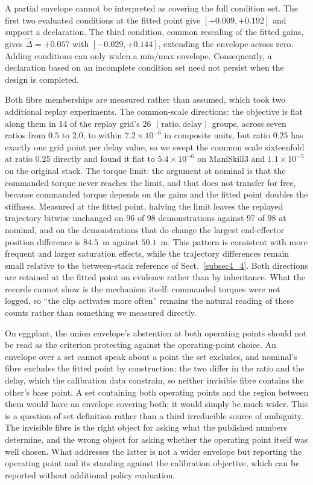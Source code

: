\documentclass[pdflatex,iicol,sn-apa]{sn-jnl}
\theoremstyle{remark}
\begin{document}
A partial envelope cannot be interpreted as covering the full condition set. The first two
evaluated conditions at the fitted point give $[+0.009, +0.192]$ and support a declaration.
The third condition, common rescaling of the fitted gains, gives $\hat\Delta = +0.057$ with
$[-0.029, +0.144]$, extending the envelope across zero. Adding conditions can only widen a
min/max envelope. Consequently, a declaration based on an incomplete condition set need not
persist when the design is completed.

Both fibre memberships are measured rather than assumed, which took two additional replay
experiments. The common-scale directions: the objective is flat along them in 14 of the replay
grid's 26 $(\text{ratio}, \text{delay})$ groups, across seven ratios from $0.5$ to $2.0$, to within
$7.2\times10^{-6}$ in composite units, but ratio $0.25$ has exactly one grid point per delay value,
so we swept the common scale sixteenfold at ratio $0.25$ directly and found it flat to
$5.4\times10^{-6}$ on ManiSkill3 and $1.1\times10^{-5}$ on the original stack. The torque limit: the
argument at nominal is that the commanded torque never reaches the limit, and that does not
transfer for free, because commanded torque depends on the gains and the fitted point doubles the
stiffness. Measured at the fitted point, halving the limit leaves the replayed trajectory bitwise
unchanged on 96 of 98 demonstrations against 97 of 98 at nominal, and on the demonstrations that do
change the largest end-effector position difference is $84.5$~\textmu m against $50.1$~\textmu m.
This pattern is consistent with more frequent and larger saturation effects, while the trajectory
differences remain small relative to the between-stack reference of Sect.~\ref{subsec4_4}. Both directions are retained at the fitted point
on evidence rather than by inheritance. What the records cannot show is the mechanism itself:
commanded torques were not logged, so ``the clip activates more often'' remains the natural reading
of these counts rather than something we measured directly.

On eggplant, the union envelope's abstention at both operating points should not be read as the criterion protecting against
the operating-point choice. An envelope over a set cannot speak about a point the set excludes, and
nominal's fibre excludes the fitted point by construction: the two differ in the ratio and the
delay, which the calibration data constrain, so neither invisible fibre contains the other's base
point. A set containing both operating points and the region between them would have an
envelope covering both; it would simply be much wider. This is a question of set definition rather than a third irreducible source of ambiguity. The invisible fibre is the right object for asking what the
published numbers determine, and the wrong object for asking whether the operating point itself was
well chosen. What addresses the latter is not a wider envelope but reporting the operating point and
its standing against the calibration objective, which can be reported without additional policy evaluation.
\end{document}
